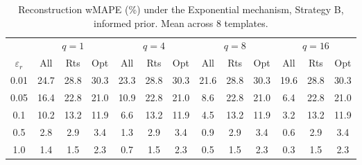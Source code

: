 \begin{table}[h]
\centering
\setlength{\tabcolsep}{2.5pt}
\small
\caption{Reconstruction wMAPE (\%) under the Exponential mechanism, Strategy B, informed prior. Mean across 8 templates.}
\label{tab:rq2_exp_B_informed}
\begin{tabular}{c|ccc|ccc|ccc|ccc}
\toprule
 & \multicolumn{3}{c|}{$q=1$} & \multicolumn{3}{c|}{$q=4$} & \multicolumn{3}{c|}{$q=8$} & \multicolumn{3}{c}{$q=16$} \\
$\varepsilon_r$ & All & Rts & Opt & All & Rts & Opt & All & Rts & Opt & All & Rts & Opt \\
\midrule
0.01 & 24.7 & 28.8 & 30.3 & 23.3 & 28.8 & 30.3 & 21.6 & 28.8 & 30.3 & 19.6 & 28.8 & 30.3 \\
0.05 & 16.4 & 22.8 & 21.0 & 10.9 & 22.8 & 21.0 & 8.6 & 22.8 & 21.0 & 6.4 & 22.8 & 21.0 \\
0.1 & 10.2 & 13.2 & 11.9 & 6.6 & 13.2 & 11.9 & 4.5 & 13.2 & 11.9 & 3.2 & 13.2 & 11.9 \\
0.5 & 2.8 & 2.9 & 3.4 & 1.3 & 2.9 & 3.4 & 0.9 & 2.9 & 3.4 & 0.6 & 2.9 & 3.4 \\
1.0 & 1.4 & 1.5 & 2.3 & 0.7 & 1.5 & 2.3 & 0.5 & 1.5 & 2.3 & 0.3 & 1.5 & 2.3 \\
\bottomrule
\end{tabular}
\end{table}
